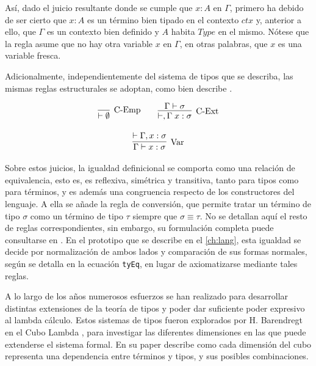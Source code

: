 Así, dado el juicio resultante donde se cumple que $x : A$ en $\Gamma$, primero ha debido de ser cierto que $x : A$ es un término bien tipado en el contexto $ctx$ y, anterior a ello, que $\Gamma$ es un contexto bien definido y $A$ habita $Type$ en el mismo. Nótese que la regla asume que no hay otra variable $x$ en $\Gamma$, en otras palabras, que $x$ es una variable fresca. 

Adicionalmente, independientemente del sistema de tipos que se describa, las mismas reglas estructurales se adoptan, como bien describe \citealp{hoffman2009}.

\begin{gather}
  \infer[\text{C-Emp}]{\vdash \emptyset}{}
  \qquad
  \infer[\text{C-Ext}]{\vdash, \Gamma\;x : \sigma}{\Gamma \vdash \sigma}
  \\[2ex]
  \infer[\text{Var}]{\Gamma \vdash x : \sigma}{\vdash \Gamma, x : \sigma}
\end{gather}

Sobre estos juicios, la igualdad definicional se comporta como una relación de equivalencia, esto es, es reflexiva, simétrica y transitiva, tanto para tipos como para términos, y es además una congruencia respecto de los constructores del lenguaje. A ella se añade la regla de conversión, que permite tratar un término de tipo $\sigma$ como un término de tipo $\tau$ siempre que $\sigma \equiv \tau$. No se detallan aquí el resto de reglas correspondientes, sin embargo, su formulación completa puede consultarse en \citep{hoffman2009}. En el prototipo que se describe en el \cref{ch:lang}, esta igualdad se decide por normalización de ambos lados y comparación de sus formas normales, según se detalla en la ecuación \texttt{tyEq}, en lugar de axiomatizarse mediante tales reglas.


A lo largo de los años numerosos esfuerzos se han realizado para desarrollar distintas extensiones de la teoría de tipos y poder dar suficiente poder expresivo al lambda cálculo. Estos sistemas de tipos fueron explorados por H. Barendregt en el Cubo Lambda \citep{cube1991}, para investigar las diferentes dimensiones en las que puede extenderse el sistema formal. En su paper describe como cada dimensión del cubo representa una dependencia entre términos y tipos, y sus posibles combinaciones.

